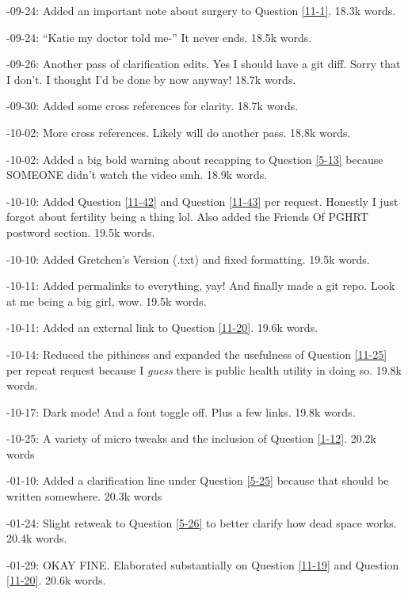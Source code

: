 \documentclass{article}
\begin{document}
-09-24: Added an important note about surgery to Question \ref{11-1}. 18.3k words.

-09-24: “Katie my doctor told me-” It never ends. 18.5k words.

-09-26: Another pass of clarification edits. Yes I should have a git diff. Sorry that I don't. I thought I'd be done by now anyway! 18.7k words.

-09-30: Added some cross references for clarity. 18.7k words.

-10-02: More cross references. Likely will do another pass. 18.8k words.

-10-02: Added a big bold warning about recapping to Question \ref{5-13} because SOMEONE didn't watch the video smh. 18.9k words.

-10-10: Added Question \ref{11-42} and Question \ref{11-43} per request. Honestly I just forgot about fertility being a thing lol. Also added the Friends Of PGHRT postword section. 19.5k words.

-10-10: Added Gretchen's Version (.txt) and fixed formatting. 19.5k words.

-10-11: Added permalinks to everything, yay! And finally made a git repo. Look at me being a big girl, wow. 19.5k words.

-10-11: Added an external link to Question \ref{11-20}. 19.6k words.

-10-14: Reduced the pithiness and expanded the usefulness of Question \ref{11-25} per repeat request because I \textit{guess} there is public health utility in doing so. 19.8k words.

-10-17: Dark mode! And a font toggle off. Plus a few links. 19.8k words.

-10-25: A variety of micro tweaks and the inclusion of Question \ref{1-12}. 20.2k words

-01-10: Added a clarification line under Question \ref{5-25} because that should be written somewhere. 20.3k words

-01-24: Slight retweak to Question \ref{5-26} to better clarify how dead space works. 20.4k words.

-01-29: OKAY FINE. Elaborated substantially on Question \ref{11-19} and Question \ref{11-20}. 20.6k words.
\end{document}
